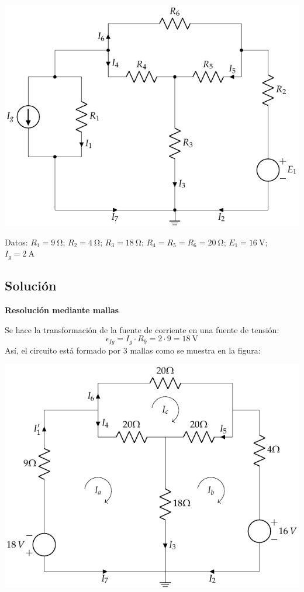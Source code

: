      \begin{center}
       \includegraphics{figuras/BT1_12.pdf}
     \end{center}

     Datos: $R_1 = \qty{9}{\ohm}$; $R_2 = \qty{4}{\ohm}$; $R_3 = \qty{18}{\ohm}$; $R_4 = R_5 = R_6 = \qty{20}{\ohm}$; $E_1 = \qty{16}{\volt}$; $I_g = \qty{2}{\ampere}$

     \subsection*{Solución}

     \textbf{Resolución mediante mallas}

     Se hace la transformación de la fuente de corriente en una fuente
     de tensión:
     \begin{equation*}
       \epsilon_{Ig}=I_g\cdot R_9=2\cdot 9=\qty{18}{\volt}
     \end{equation*}
     Así, el circuito está formado por 3 mallas como se muestra en la
     figura:
     \begin{center}
       \includegraphics{figuras/BT1_12_mallas.pdf}
     \end{center}
     
